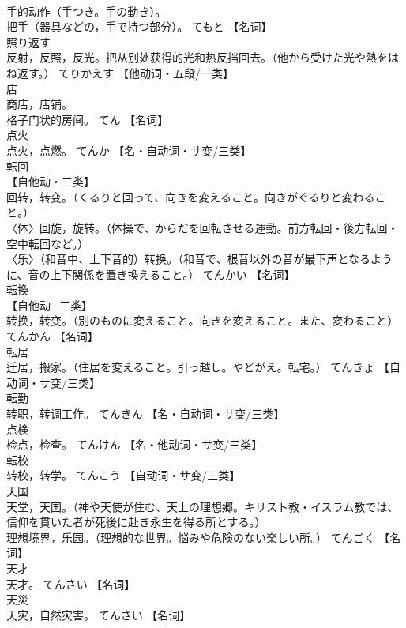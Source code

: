 \documentclass[8pt]{extreport}
\begin{document}
\begin{CJK}{UTF8}{min}
\\	手的动作（手つき。手の動き）。 
\\	把手（器具などの，手で持つ部分）。	てもと		【名词】
\\	照り返す	
\\	反射，反照，反光。把从别处获得的光和热反挡回去。（他から受けた光や熱をはね返す。）	てりかえす		【他动词・五段/一类】
\\	店	
\\	商店，店铺。 
\\	格子门状的房间。	てん		【名词】
\\	点火	
\\	点火，点燃。	てんか		【名・自动词・サ变/三类】
\\	転回	
\\	【自他动・三类】 
\\	回转，转变。（くるりと回って、向きを変えること。向きがぐるりと変わること。） 
\\	〈体〉回旋，旋转。（体操で、からだを回転させる運動。前方転回・後方転回・空中転回など。） 
\\	〈乐〉（和音中、上下音的）转换。（和音で、根音以外の音が最下声となるように、音の上下関係を置き換えること。）	てんかい		【名词】
\\	転換	
\\	【自他动·三类】 
\\	转换，转变。（別のものに変えること。向きを変えること。また、変わること）	てんかん		【名词】
\\	転居	
\\	迁居，搬家。（住居を変えること。引っ越し。やどがえ。転宅。）	てんきょ		【自动词・サ变/三类】
\\	転勤	
\\	转职，转调工作。	てんきん		【名・自动词・サ变/三类】
\\	点検	
\\	检点，检查。	てんけん		【名・他动词・サ变/三类】
\\	転校	
\\	转校，转学。	てんこう		【自动词・サ变/三类】
\\	天国	
\\	天堂，天国。（神や天使が住む、天上の理想郷。キリスト教・イスラム教では、信仰を貫いた者が死後に赴き永生を得る所とする。） 
\\	理想境界，乐园。（理想的な世界。悩みや危険のない楽しい所。）	てんごく		【名词】
\\	天才	
\\	天才。	てんさい		【名词】
\\	天災	
\\	天灾，自然灾害。	てんさい		【名词】

\end{CJK}
\end{document}
